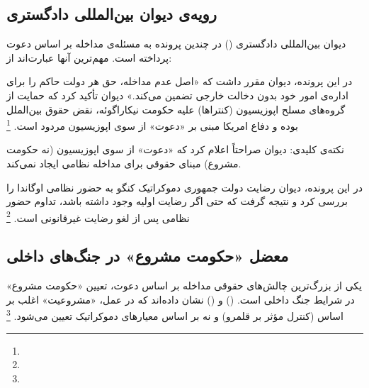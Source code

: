 \subsection{رویه‌ی دیوان بین‌المللی دادگستری}
\label{subsec:ch02-icj}

دیوان بین‌المللی دادگستری () در چندین پرونده به مسئله‌ی مداخله بر اساس دعوت پرداخته است. مهم‌ترین آنها عبارت‌اند از:

\begin{tcolorbox}[casebox, title={پرونده‌ی نیکاراگوئه علیه ایالات متحده (۱۹۸۶)}]
در این پرونده، دیوان مقرر داشت که «اصل عدم مداخله، حق هر دولت حاکم را برای اداره‌ی امور خود بدون دخالت خارجی تضمین می‌کند.» دیوان تأکید کرد که حمایت از گروه‌های مسلح اپوزیسیون (کنتراها) علیه حکومت نیکاراگوئه، نقض حقوق بین‌الملل بوده و دفاع امریکا مبنی بر «دعوت» از سوی اپوزیسیون مردود است.%
\footnote{}

نکته‌ی کلیدی: دیوان صراحتاً اعلام کرد که «دعوت» از سوی اپوزیسیون (نه حکومت مشروع) مبنای حقوقی برای مداخله نظامی ایجاد نمی‌کند.
\end{tcolorbox}

\begin{tcolorbox}[casebox, title={پرونده‌ی فعالیت‌های مسلحانه در قلمرو کنگو (۲۰۰۵)}]
در این پرونده، دیوان رضایت دولت جمهوری دموکراتیک کنگو به حضور نظامی اوگاندا را بررسی کرد و نتیجه گرفت که حتی اگر رضایت اولیه وجود داشته باشد، تداوم حضور نظامی پس از لغو رضایت غیرقانونی است.%
\footnote{}
\end{tcolorbox}

\subsection{معضل «حکومت مشروع» در جنگ‌های داخلی}
\label{subsec:ch02-legitimate-gov}

یکی از بزرگ‌ترین چالش‌های حقوقی مداخله بر اساس دعوت، تعیین «حکومت مشروع» در شرایط جنگ داخلی است.  () و  () نشان داده‌اند که در عمل، «مشروعیت» اغلب بر اساس  (کنترل مؤثر بر قلمرو) و نه بر اساس معیارهای دموکراتیک تعیین می‌شود.%
\footnote{}

